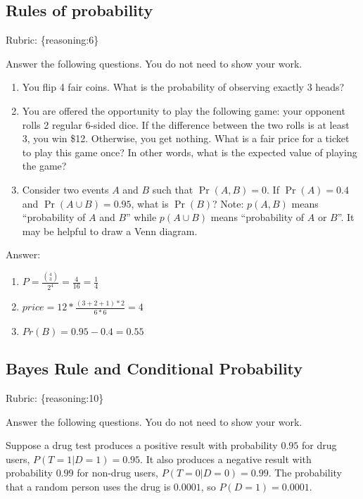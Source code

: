 \documentclass{article}
\def\rubric#1{\gre{Rubric: \{#1\}}}{}
\def\blu#1{{\color{blu}#1}}
\def\gre#1{{\color{gre}#1}}
\def\red#1{{\color{red}#1}}
\def\enum#1{\begin{enumerate}#1\end{enumerate}}
\begin{document}
\subsection{Rules of probability}
\rubric{reasoning:6}

\blu{Answer the following questions.} You do not need to show your work.

\begin{enumerate}
\item You flip 4 fair coins. What is the probability of observing \red{exactly} 3 heads?
\item You are offered the opportunity to play the following game: your opponent rolls 2 regular 6-sided dice. If the difference between the two rolls is at least 3, you win \$12. Otherwise, you get nothing. What is a fair price for a ticket to play this game once? In other words, what is the expected value of playing the game?
\item Consider two events $A$ and $B$ such that $\Pr(A, B)=0$. If $\Pr(A) = 0.4$ and $\Pr(A \cup B) = 0.95$, what is $\Pr(B)$? Note: $p(A, B)$ means
``probability of $A$ and $B$'' while $p(A \cup B)$ means ``probability of $A$ or $B$''. It may be helpful to draw a Venn diagram.
\end{enumerate}
\textcolor{gre}{
Answer:
\enum{
\item $P=\frac{{4 \choose 3}}{2^4}=\frac{4}{16}=\frac{1}{4}$
\item $price=12*\frac{(3+2+1)*2}{6*6}=4$
\item $Pr(B)=0.95-0.4=0.55$
}}
\subsection{Bayes Rule and Conditional Probability}
\rubric{reasoning:10}

\blu{Answer the following questions.} You do not need to show your work.

Suppose a drug test produces a positive result with probability $0.95$ for drug users, $P(T=1|D=1)=0.95$. It also produces a negative result with probability $0.99$ for non-drug users, $P(T=0|D=0)=0.99$. The probability that a random person uses the drug is $0.0001$, so $P(D=1)=0.0001$.
\end{document}
